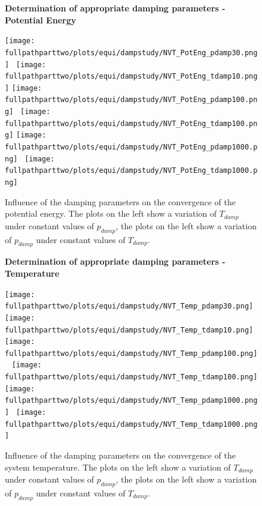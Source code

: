 \documentclass[10pt,a4paper]{report}
\def \fullpathparttwo {/home/lukas/Desktop/project/independence/atomistic_modeling/exam/2_Two-dimensional_atomic_tensile_test}
\newcommand*{\figuretitle}[1]{%
    {\centering%
    \textbf{#1}%
    \par\medskip}%
}
\begin{document}
\begin{center}
\begin{figure}[h]
\figuretitle{Determination of appropriate damping parameters - Potential Energy}
\texttt{[image: \\fullpathparttwo/plots/equi/dampstudy/NVT\_PotEng\_pdamp30.png]}~
\texttt{[image: \\fullpathparttwo/plots/equi/dampstudy/NVT\_PotEng\_tdamp10.png]}
\texttt{[image: \\fullpathparttwo/plots/equi/dampstudy/NVT\_PotEng\_pdamp100.png]}~
\texttt{[image: \\fullpathparttwo/plots/equi/dampstudy/NVT\_PotEng\_tdamp100.png]}
\texttt{[image: \\fullpathparttwo/plots/equi/dampstudy/NVT\_PotEng\_pdamp1000.png]}~
\texttt{[image: \\fullpathparttwo/plots/equi/dampstudy/NVT\_PotEng\_tdamp1000.png]}
\caption[Determination of appropriate damping parameters - Potential Energy]{Influence of the damping parameters on the convergence of the potential energy. The plots on the left show a variation of $T_{damp}$ under constant values of $p_{damp}$, the plots on the left show a variation of $p_{damp}$ under constant values of $T_{damp}$.}
\label{fig:p2_dampstudy_PotEng}
\end{figure}
\end{center}

\begin{center}
\begin{figure}[h]
\figuretitle{Determination of appropriate damping parameters - Temperature}
\texttt{[image: \\fullpathparttwo/plots/equi/dampstudy/NVT\_Temp\_pdamp30.png]}~
\texttt{[image: \\fullpathparttwo/plots/equi/dampstudy/NVT\_Temp\_tdamp10.png]}
\texttt{[image: \\fullpathparttwo/plots/equi/dampstudy/NVT\_Temp\_pdamp100.png]}~
\texttt{[image: \\fullpathparttwo/plots/equi/dampstudy/NVT\_Temp\_tdamp100.png]}
\texttt{[image: \\fullpathparttwo/plots/equi/dampstudy/NVT\_Temp\_pdamp1000.png]}~
\texttt{[image: \\fullpathparttwo/plots/equi/dampstudy/NVT\_Temp\_tdamp1000.png]}
\caption[Determination of appropriate damping parameters - Temperature]{Influence of the damping parameters on the convergence of the system temperature. The plots on the left show a variation of $T_{damp}$ under constant values of $p_{damp}$, the plots on the left show a variation of $p_{damp}$ under constant values of $T_{damp}$.}
\label{fig:p2_dampstudy_PotEng}
\end{figure}
\end{center}
\end{document}
